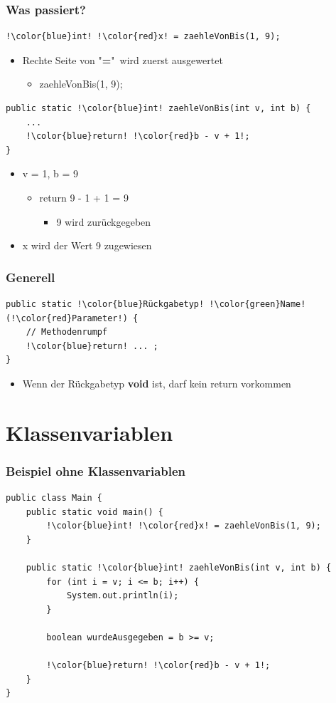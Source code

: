 \documentclass[final]{beamer}
\begin{document}
\begin{frame}[containsverbatim]
	\frametitle{Was passiert?}
	\begin{lstlisting}[escapechar=!]
!\color{blue}int! !\color{red}x! = zaehleVonBis(1, 9);
	\end{lstlisting}
	\begin{itemize}
		\item{Rechte Seite von "\textbf{=}"\ wird zuerst ausgewertet
			\begin{itemize}
				\item{zaehleVonBis(1, 9);}
			\end{itemize}
		}
	\end{itemize}
	\begin{lstlisting}[escapechar=!]
public static !\color{blue}int! zaehleVonBis(int v, int b) {
	...
	!\color{blue}return! !\color{red}b - v + 1!;
}
	\end{lstlisting}
	\begin{itemize}
		\item{v = 1, b = 9
			\begin{itemize}
				\item{return 9 - 1 + 1 = 9}
					\begin{itemize}
						\item{9 wird zurückgegeben}
					\end{itemize}
			\end{itemize}
		}
		\item{{\color{red}x} wird der Wert 9 zugewiesen}
	\end{itemize}
\end{frame}

\begin{frame}[containsverbatim]
	\frametitle{Generell}
	\begin{lstlisting}[escapechar=!]
public static !\color{blue}Rückgabetyp! !\color{green}Name! (!\color{red}Parameter!) {
	// Methodenrumpf
	!\color{blue}return! ... ; 
}
	\end{lstlisting}
	\begin{itemize}
		\item{Wenn der {\color{blue}Rückgabetyp} \textbf{void} ist, darf kein {\color{blue}return} vorkommen}
	\end{itemize}
\end{frame}

\section{Klassenvariablen}
\begin{frame}[containsverbatim]
	\frametitle{Beispiel ohne Klassenvariablen}
	\begin{lstlisting}[escapechar=!]
public class Main {
	public static void main() {
		!\color{blue}int! !\color{red}x! = zaehleVonBis(1, 9);
	}
	
	public static !\color{blue}int! zaehleVonBis(int v, int b) {
		for (int i = v; i <= b; i++) {
			System.out.println(i);
		}
		
		boolean wurdeAusgegeben = b >= v;
		
		!\color{blue}return! !\color{red}b - v + 1!;
	}
}
	\end{lstlisting}
\end{frame}
\end{document}

